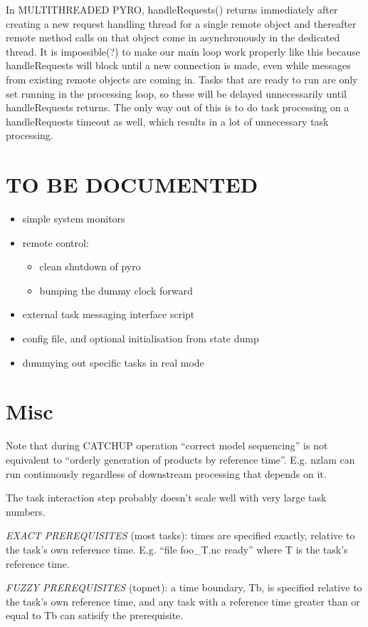 \documentclass[12pt]{article}
\begin{document}
In MULTITHREADED PYRO, handleRequests() returns immediately after creating a
new request handling thread for a single remote object and thereafter remote
method calls on that object come in asynchronously in the dedicated thread.
It is impossible(?) to make our main loop work properly like this because
handleRequests will block until a new connection is made, even while messages
from existing remote objects are coming in.  Tasks that are ready to run are
only set running in the processing loop, so these will be delayed
unnecessarily until handleRequests returns.  The only way out of this is to do
task processing on a handleRequests timeout as well, which results in a lot of
unnecessary task processing.
 

\section{TO BE DOCUMENTED}

\begin{itemize}
 \item simple system monitors
 \item remote control: 
    \begin{itemize}
    \item clean shutdown of pyro
    \item bumping the dummy clock forward
    \end{itemize}
 \item external task messaging interface script
 \item config file, and optional initialisation from state dump
 \item dummying out specific tasks in real mode
\end{itemize}

\section{Misc}

Note that during CATCHUP operation ``correct model sequencing'' is not
equivalent to ``orderly generation of products by reference time''.  E.g. nzlam
can run continuously regardless of downstream processing that depends on it.

The task interaction step probably doesn't scale well with very large task numbers.

{\em EXACT PREREQUISITES} (most tasks): times are specified exactly,
relative to the task's own reference time.  E.g. ``file foo\_{T}.nc
ready'' where T is the task's reference time.

{\em FUZZY PREREQUISITES} (topnet): a time boundary, Tb, is specified
relative to the task's own reference time, and any task with a reference
time greater than or equal to Tb can satisify the prerequisite.
\end{document}
